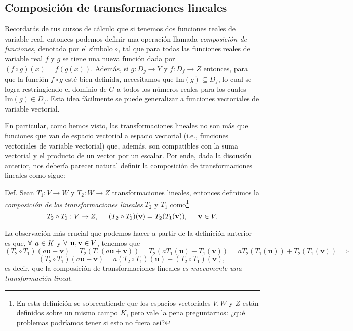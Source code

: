 \documentclass[12pt]{article}
\begin{document}
\subsection{Composición de transformaciones lineales}

Recordarás de tus cursos de cálculo que si tenemos dos funciones reales de variable real, entonces podemos definir una operación llamada \emph{composición de funciones}, denotada por el símbolo $\circ$, tal que para todas las funciones reales de variable real $f$ y $g$ se tiene una nueva función dada por $(f\circ g)(x) = f(g(x)).$ Además, si $g:D_g\to Y$ y $f:D_f\to Z$ entonces, para que la función $f\circ g$ esté bien definida, necesitamos que $\text{Im}(g)\subseteq D_f$, lo cual se logra restringiendo el dominio de $G$ a todos los números reales para los cuales $\text{Im}(g)\in D_f$. Esta idea fácilmente se puede generalizar a funciones vectoriales de variable vectorial.

En particular, como hemos visto, las transformaciones lineales no son más que funciones que van de espacio vectorial a espacio vectorial (i.e., funciones vectoriales de variable vectorial) que, además, son compatibles con la suma vectorial y el producto de un vector por un escalar. Por ende, dada la discusión anterior, nos debería parecer natural definir la composición de transformaciones lineales como sigue:
\vspace{3mm}

\begin{tcolorbox} \label{Def:Composición_de_transformaciones_lineales}
\underline{Def.} Sean $T_1: V\to W$ y $T_2: W\to Z$ transformaciones lineales, entonces definimos la \emph{composición de las transformaciones lineales} $T_2$ y $T_1$ como\footnote{En esta definición se sobreentiende que los espacios vectoriales $V, W$ y $Z$ están definidos sobre un mismo campo $K$, pero vale la pena preguntarnos: ¿qué problemas podríamos tener si esto no fuera así?} \[T_2\circ T_1:V\to Z, \hspace{5mm} (T_2\circ T_1)(\mathbf{v}) = T_2(T_1(\mathbf{v})), \hspace{5mm} \mathbf{v}\in V.\]

\end{tcolorbox}

La observación más crucial que podemos hacer a partir de la definición anterior es que, $\forall \hspace{1.5mm} a\in K$ y $\forall \hspace{1.5mm} \mathbf{u},\mathbf{v}\in V$, tenemos que \[(T_2\circ T_1)(a\mathbf{u}+\mathbf{v})=T_2(T_1(a\mathbf{u}+\mathbf{v}))=T_2(aT_1(\mathbf{u})+T_1(\mathbf{v})) = aT_2(T_1(\mathbf{u}))+T_2(T_1(\mathbf{v}))\implies\] \[(T_2\circ T_1)(a\mathbf{u}+\mathbf{v})=a(T_2\circ T_1)(\mathbf{u})+(T_2\circ T_1)(\mathbf{v}),\] \noindent es decir, que la composición de transformaciones lineales \emph{es nuevamente una transformación lineal}.
\end{document}
